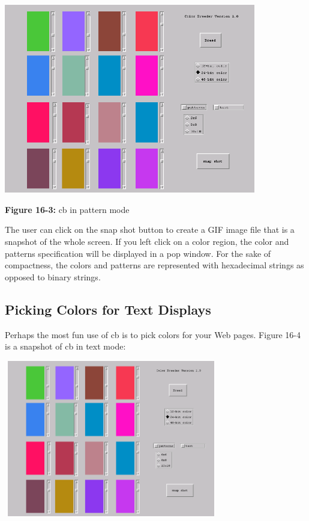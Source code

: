 \begin{center}
\includegraphics[width=4.3335in,height=3.252in]{ub-img/ub-img47.png}
\end{center}

{\sffamily\bfseries Figure 16-3:}
{\sffamily cb in pattern mode}

The user can click on the snap shot button to create a GIF image file
that is a snapshot of the whole screen. If you left click on a color
region, the color and patterns specification will be displayed in a pop
window. For the sake of compactness, the colors and patterns are
represented with hexadecimal strings as opposed to binary strings. 

\subsection{Picking Colors for Text Displays}

Perhaps the most fun use of \textsf{cb} is to pick colors for your Web
pages. Figure 16-4 is a snapshot of \textsf{cb} in text mode:

\bigskip

\begin{center}
\includegraphics[width=3.6811in,height=2.6929in]{ub-img/ub-img48.png}
\end{center}

